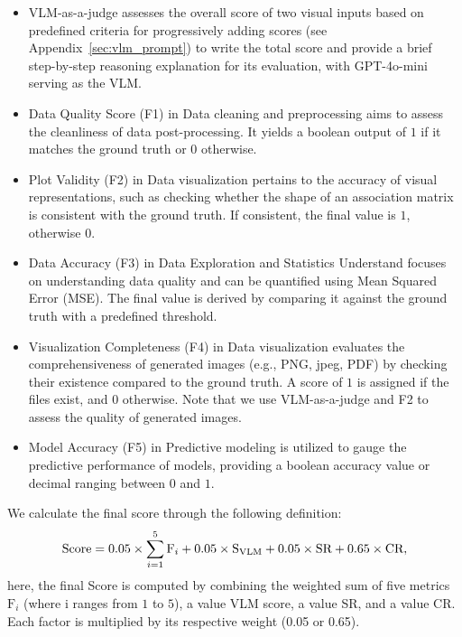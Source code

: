 \begin{itemize}[leftmargin=*,itemsep=0pt,parsep=0.5em,topsep=0.3em,partopsep=0.3em]
    \item VLM-as-a-judge assesses the overall score of two visual inputs based on predefined criteria for progressively adding scores (see Appendix~\ref{sec:vlm_prompt}) to write the total score and provide a brief step-by-step reasoning explanation for its evaluation, with GPT-4o-mini serving as the VLM.
    \item Data Quality Score (F1) in Data cleaning and preprocessing aims to assess the cleanliness of data post-processing. It yields a boolean output of $1$ if it matches the ground truth or $0$ otherwise.
    \item Plot Validity (F2) in Data visualization pertains to the accuracy of visual representations, such as checking whether the shape of an association matrix is consistent with the ground truth. If consistent, the final value is $1$, otherwise $0$.
    \item Data Accuracy (F3) in Data Exploration and Statistics Understand focuses on understanding data quality and can be quantified using Mean Squared Error (MSE). The final value is derived by comparing it against the ground truth with a predefined threshold.
    \item Visualization Completeness (F4) in Data visualization evaluates the comprehensiveness of generated images (e.g., PNG, jpeg, PDF) by checking their existence compared to the ground truth. A score of $1$ is assigned if the files exist, and $0$ otherwise. Note that we use VLM-as-a-judge and F2 to assess the quality of generated images. 
    \item Model Accuracy (F5) in Predictive modeling is utilized to gauge the predictive performance of models, providing a boolean accuracy value or decimal ranging between $0$ and $1$.
\end{itemize}

 We calculate the final score through the following definition:
\small
\begin{equation}
    \vspace{-0.1cm}
    \text{Score}=0.05 \times \sum_{i=1}^{5}\text{F}_i + 0.05 \times \text{S}_\text{VLM} + 0.05 \times \text{SR} + 0.65 \times \text{CR},
    \vspace{-0.05cm}
\end{equation}
\normalsize
here, the final Score is computed by combining the weighted sum of five metrics $\text{F}_{i}$ (where i ranges from $1$ to $5$), a value VLM score, a value SR, and a value CR. Each factor is multiplied by its respective weight (0.05 or 0.65).